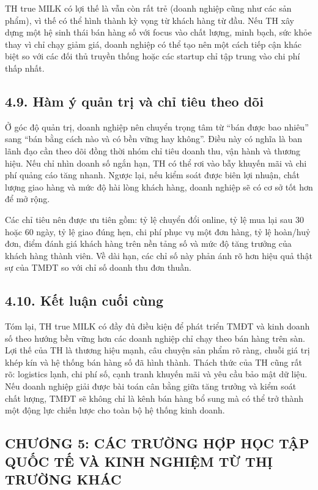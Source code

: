 TH true MILK có lợi thế là vẫn còn rất trẻ (doanh nghiệp cũng như các sản phẩm), vì thế có thể hình thành kỳ vọng từ khách hàng từ đầu. Nếu TH xây dựng một hệ sinh thái bán hàng số với focus vào chất lượng, minh bạch, sức khỏe thay vì chỉ chạy giảm giá, doanh nghiệp có thể tạo nên một cách tiếp cận khác biệt so với các đối thủ truyền thống hoặc các startup chỉ tập trung vào chi phí thấp nhất.

\subsection*{4.9. Hàm ý quản trị và chỉ tiêu theo dõi}
Ở góc độ quản trị, doanh nghiệp nên chuyển trọng tâm từ “bán được bao nhiêu” sang “bán bằng cách nào và có bền vững hay không”. Điều này có nghĩa là ban lãnh đạo cần theo dõi đồng thời nhóm chỉ tiêu doanh thu, vận hành và thương hiệu. Nếu chỉ nhìn doanh số ngắn hạn, TH có thể rơi vào bẫy khuyến mãi và chi phí quảng cáo tăng nhanh. Ngược lại, nếu kiểm soát được biên lợi nhuận, chất lượng giao hàng và mức độ hài lòng khách hàng, doanh nghiệp sẽ có cơ sở tốt hơn để mở rộng.

Các chỉ tiêu nên được ưu tiên gồm: tỷ lệ chuyển đổi online, tỷ lệ mua lại sau 30 hoặc 60 ngày, tỷ lệ giao đúng hẹn, chi phí phục vụ một đơn hàng, tỷ lệ hoàn/huỷ đơn, điểm đánh giá khách hàng trên nền tảng số và mức độ tăng trưởng của khách hàng thành viên. Về dài hạn, các chỉ số này phản ánh rõ hơn hiệu quả thật sự của TMĐT so với chỉ số doanh thu đơn thuần.

\subsection*{4.10. Kết luận cuối cùng}
Tóm lại, TH true MILK có đầy đủ điều kiện để phát triển TMĐT và kinh doanh số theo hướng bền vững hơn các doanh nghiệp chỉ chạy theo bán hàng trên sàn. Lợi thế của TH là thương hiệu mạnh, câu chuyện sản phẩm rõ ràng, chuỗi giá trị khép kín và hệ thống bán hàng số đã hình thành. Thách thức của TH cũng rất rõ: logistics lạnh, chi phí số, cạnh tranh khuyến mãi và yêu cầu bảo mật dữ liệu. Nếu doanh nghiệp giải được bài toán cân bằng giữa tăng trưởng và kiểm soát chất lượng, TMĐT sẽ không chỉ là kênh bán hàng bổ sung mà có thể trở thành một động lực chiến lược cho toàn bộ hệ thống kinh doanh.

\subsection*{CHƯƠNG 5: CÁC TRƯỜNG HỢP HỌC TẬP QUỐC TẾ VÀ KINH NGHIỆM TỪ THỊ TRƯỜNG KHÁC}

